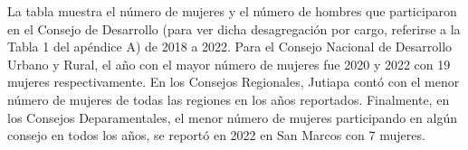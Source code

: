 La tabla muestra el número de mujeres y el número de hombres que participaron en el Consejo de Desarrollo (para ver dicha desagregación por cargo, referirse a la Tabla 1 del apéndice A) de  2018 a 2022. Para el Consejo Nacional de Desarrollo Urbano y Rural, el año con el mayor número de mujeres fue 2020 y 2022 con 19 mujeres respectivamente. En los Consejos Regionales, Jutiapa contó con el menor número de mujeres de todas las regiones en los años reportados. Finalmente, en los Consejos Deparamentales, el menor número de mujeres participando en algún consejo en todos los años, se reportó en 2022 en San Marcos con 7 mujeres. 